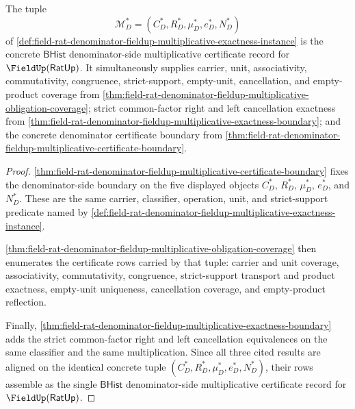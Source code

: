 \begin{theorem}
\label{thm:field-rat-denominator-fieldup-multiplicative-certificate-record}
The tuple
$$
\mathcal{M}_D^\ast=(C_D^\ast,R_D^\ast,\mu_D^\ast,e_D^\ast,N_D^\ast)
$$
of
\autoref{def:field-rat-denominator-fieldup-multiplicative-exactness-instance}
is the concrete $\mathsf{BHist}$ denominator-side multiplicative certificate
record for $\FieldUp(\mathsf{RatUp})$. It simultaneously supplies carrier,
unit, associativity, commutativity, congruence, strict-support,
empty-unit, cancellation, and empty-product coverage from
\autoref{thm:field-rat-denominator-fieldup-multiplicative-obligation-coverage};
strict common-factor right and left cancellation exactness from
\autoref{thm:field-rat-denominator-fieldup-multiplicative-exactness-boundary};
and the concrete denominator certificate boundary from
\autoref{thm:field-rat-denominator-fieldup-multiplicative-certificate-boundary}.
\end{theorem}
\begin{proof}
\autoref{thm:field-rat-denominator-fieldup-multiplicative-certificate-boundary}
fixes the denominator-side boundary on the five displayed objects
$C_D^\ast$, $R_D^\ast$, $\mu_D^\ast$, $e_D^\ast$, and $N_D^\ast$. These are
the same carrier, classifier, operation, unit, and strict-support predicate
named by
\autoref{def:field-rat-denominator-fieldup-multiplicative-exactness-instance}.

\autoref{thm:field-rat-denominator-fieldup-multiplicative-obligation-coverage}
then enumerates the certificate rows carried by that tuple: carrier and unit
coverage, associativity, commutativity, congruence, strict-support transport
and product exactness, empty-unit uniqueness, cancellation coverage, and
empty-product reflection.

Finally,
\autoref{thm:field-rat-denominator-fieldup-multiplicative-exactness-boundary}
adds the strict common-factor right and left cancellation equivalences on the
same classifier and the same multiplication. Since all three cited results are
aligned on the identical concrete tuple
$(C_D^\ast,R_D^\ast,\mu_D^\ast,e_D^\ast,N_D^\ast)$, their rows assemble as the
single $\mathsf{BHist}$ denominator-side multiplicative certificate record for
$\FieldUp(\mathsf{RatUp})$.
\end{proof}

